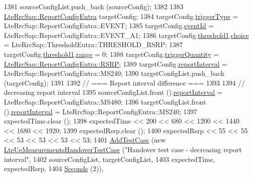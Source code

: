 \begin{DoxyCode}
1381   sourceConfigList.push\_back (sourceConfig);
1382 
1383   \hyperlink{structns3_1_1LteRrcSap_1_1ReportConfigEutra}{LteRrcSap::ReportConfigEutra} targetConfig;
1384   targetConfig.\hyperlink{structns3_1_1LteRrcSap_1_1ReportConfigEutra_a502800e0549f5ed2fe9f0cd7b8ee3415}{triggerType} = LteRrcSap::ReportConfigEutra::EVENT;
1385   targetConfig.\hyperlink{structns3_1_1LteRrcSap_1_1ReportConfigEutra_a1fbe931cc9584614d20f4affbce70d8a}{eventId} = LteRrcSap::ReportConfigEutra::EVENT\_A1;
1386   targetConfig.\hyperlink{structns3_1_1LteRrcSap_1_1ReportConfigEutra_a8f36bc45a61054920e490be8bf33b4ca}{threshold1}.\hyperlink{structns3_1_1LteRrcSap_1_1ThresholdEutra_a4c7eed6102d1cd143c063ac845095f75}{choice} = LteRrcSap::ThresholdEutra::THRESHOLD\_RSRP;
1387   targetConfig.\hyperlink{structns3_1_1LteRrcSap_1_1ReportConfigEutra_a8f36bc45a61054920e490be8bf33b4ca}{threshold1}.\hyperlink{structns3_1_1LteRrcSap_1_1ThresholdEutra_abd4950e20a1a93727535e8364bf85b03}{range} = 0;
1388   targetConfig.\hyperlink{structns3_1_1LteRrcSap_1_1ReportConfigEutra_a735700933e50f1b4680f856d37c777f9}{triggerQuantity} = 
      \hyperlink{lte__ue__measurements_8m_a4365fe76972c942aa409d50c57f9fc3e}{LteRrcSap::ReportConfigEutra::RSRP};
1389   targetConfig.\hyperlink{structns3_1_1LteRrcSap_1_1ReportConfigEutra_a8688bf528a9f1a027fe8570965adacdb}{reportInterval} = LteRrcSap::ReportConfigEutra::MS240;
1390   targetConfigList.push\_back (targetConfig);
1391 
1392   \textcolor{comment}{// === Report interval difference ===}
1393 
1394   \textcolor{comment}{// decreasing report interval}
1395   sourceConfigList.front ().\hyperlink{structns3_1_1LteRrcSap_1_1ReportConfigEutra_a8688bf528a9f1a027fe8570965adacdb}{reportInterval} = LteRrcSap::ReportConfigEutra::MS480;
1396   targetConfigList.front ().\hyperlink{structns3_1_1LteRrcSap_1_1ReportConfigEutra_a8688bf528a9f1a027fe8570965adacdb}{reportInterval} = LteRrcSap::ReportConfigEutra::MS240;
1397   expectedTime.clear ();
1398   expectedTime << 200 << 680 << 1200 << 1440 << 1680 << 1920;
1399   expectedRsrp.clear ();
1400   expectedRsrp << 55 << 55 << 53 << 53 << 53 << 53;
1401   \hyperlink{classns3_1_1TestCase_a3718088e3eefd5d6454569d2e0ddd835}{AddTestCase} (\textcolor{keyword}{new} \hyperlink{classLteUeMeasurementsHandoverTestCase}{LteUeMeasurementsHandoverTestCase} (\textcolor{stringliteral}{"Handover
       test case - decreasing report interval"},
1402                                                       sourceConfigList, targetConfigList,
1403                                                       expectedTime, expectedRsrp,
1404                                                       \hyperlink{group__timecivil_ga33c34b816f8ff6628e33d5c8e9713b9e}{Seconds} (2)),

\end{DoxyCode}
